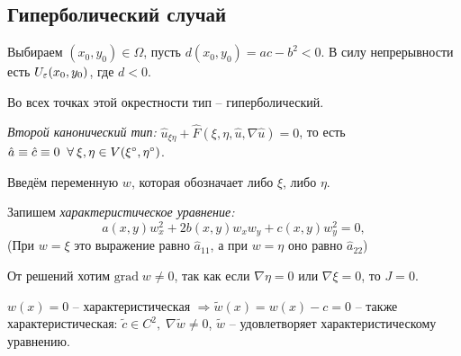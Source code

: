 \documentclass[../main.tex]{subfiles}
\begin{document}
\subsection{Гиперболический случай}

Выбираем $(x_0, y_0) \in \Omega$, пусть $d(x_0, y_0) = ac - b^2 < 0$. В силу непрерывности есть $U_\varepsilon(x_0, y_0)$, где $d < 0$.

Во всех точках этой окрестности тип -- гиперболический.

\begin{definition}
\textit{Второй канонический тип:} $\hat{u}_{\xi\eta} + \hat{F}(\xi, \eta, \hat{u}, \nabla \hat{u}) = 0$, то есть $\hat{a} \equiv \hat{c} \equiv 0 \;\;\forall\: \xi, \eta \in V(\xi^{\circ}, \eta^{\circ})$.
\end{definition}
Введём переменную $w$, которая обозначает либо $\xi$, либо $\eta$.

Запишем \textit{характеристическое уравнение:}
\begin{equation*}
	a(x, y) w^{2}_x + 2b(x, y)w_x w_y + c(x, y)w_y^2  = 0, 
\end{equation*}
(При $w = \xi$ это выражение равно $\hat a_{11}$, а при $w = \eta$ оно равно $\hat a_{22}$)

От решений хотим $\text{grad}\;w \neq 0$, так как если $\nabla \eta = 0$ или $\nabla \xi = 0$, то $J = 0$.

\begin{remark}
	$w(x) = 0$ -- характеристическая $\Rightarrow \tilde{w}(x) =  w(x) - c = 0$ -- также характеристическая: $\tilde{c} \in C^2,\; \nabla \tilde{w} \neq 0$, $\tilde{w}$ -- удовлетворяет характеристическому уравнению.
\end{remark}
\end{document}
